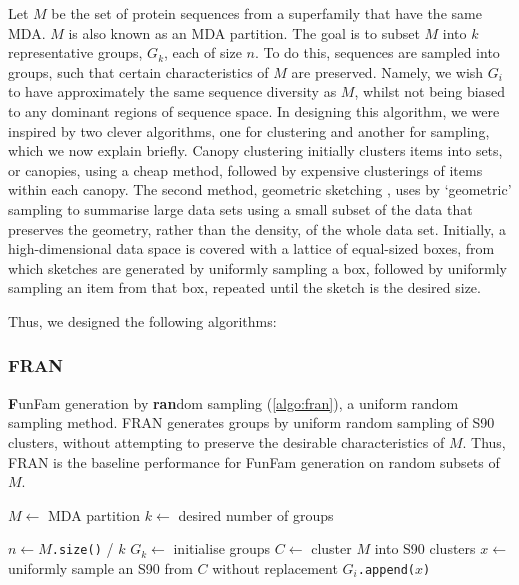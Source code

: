 Let $M$ be the set of protein sequences from a superfamily that have the same MDA. $M$ is also known as an MDA partition. The goal is to subset $M$ into $k$ representative groups, $G_k$, each of size $n$. To do this, sequences are sampled into groups, such that certain characteristics of $M$ are preserved. Namely, we wish $G_i$ to have approximately the same sequence diversity as $M$, whilst not being biased to any dominant regions of sequence space. In designing this algorithm, we were inspired by two clever algorithms, one for clustering and another for sampling, which we now explain briefly. Canopy clustering \cite{McCallum2000} initially clusters items into sets, or canopies, using a cheap method, followed by expensive clusterings of items within each canopy. The second method, geometric sketching \cite{Hie2019}, uses by `geometric' sampling to summarise large data sets using a small subset of the data that preserves the geometry, rather than the density, of the whole data set. Initially, a high-dimensional data space is covered with a lattice of equal-sized boxes, from which sketches are generated by uniformly sampling a box, followed by uniformly sampling an item from that box, repeated until the sketch is the desired size.

Thus, we designed the following algorithms:

\subsubsection{FRAN}

\textbf{F}unFam generation by \textbf{ran}dom sampling (\ref{algo:fran}), a uniform random sampling method. FRAN generates groups by uniform random sampling of S90 clusters, without attempting to preserve the desirable characteristics of $M$. Thus, FRAN is the baseline performance for FunFam generation on random subsets of $M$.

\begin{algorithm}[hbt!]
    \caption{%
        FRAN.
    }
    \label{algo:fran}
    \begin{algorithmic}[1]
        \State $M \gets$ MDA partition
        \State $k \gets$ desired number of groups


        \State $n \gets M$\texttt{.size()} / $k$
        \State $G_k \gets$ initialise groups
        \State $C \gets$ cluster $M$ into S90 clusters
                \State $x \gets$ uniformly sample an S90 from $C$ without replacement
                \State $G_i$\texttt{.append($x$)}
            \EndWhile
        \EndFor
        \EndProcedure
    \end{algorithmic}
\end{algorithm}

